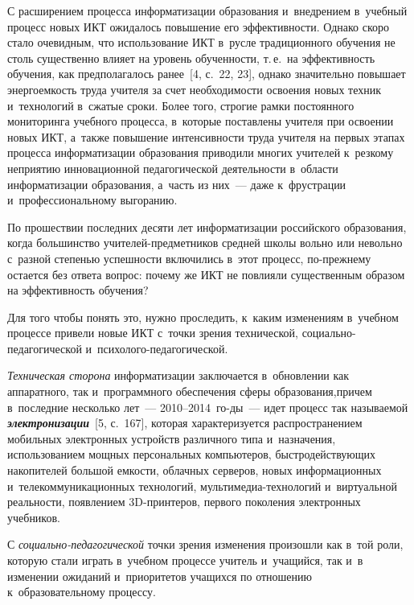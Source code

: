 \begin{multicols}{2}
  С расширением процесса информатизации образования и~внедрением в~учебный процесс
новых ИКТ ожидалось повышение его эффектив\-ности. Однако скоро стало очевидным, что
использование ИКТ в~русле традиционного обучения не столь существенно влияет на уровень
обучен\-ности, т.\,е.\ на эффективность обучения, как предполагалось ранее~[4, с.~22, 23], однако
значительно повышает энергоемкость труда учителя за счет необходимости освоения новых
техник и~технологий в~сжатые сроки. Более того, строгие рамки постоянного мониторинга
учебного процесса, в~которые поставлены учителя при освоении новых ИКТ, а~также
повышение интенсивности труда учителя на первых этапах процесса информатизации
образования приводили многих учителей к~резкому неприятию инновационной педагогической
деятельности в~области информатизации образования, а~часть из них~--- даже к~фрустрации
и~профессиональному выгоранию.

  По прошествии последних десяти лет информатизации российского образования, когда
большинство учи\-те\-лей-пред\-мет\-ни\-ков средней школы вольно или невольно с~разной
степенью успешности включились в~этот процесс, по-преж\-не\-му остается без ответа вопрос:
почему же ИКТ не повлияли существенным образом на эффективность обучения?

  Для того чтобы понять это, нужно проследить, к~каким изменениям в~учебном процессе
привели новые ИКТ с~точки зрения технической, со\-ци\-аль\-но-пе\-да\-го\-ги\-че\-ской
  и~пси\-хо\-ло\-го-пе\-да\-го\-ги\-ческой.

  \textit{Техническая сторона} информатизации заклю\-чается в~обновлении как аппаратного,
так и~программного обеспечения сферы образования,\linebreak причем в~последние несколько лет~---
2010--2014~го-\linebreak ды~--- идет процесс так называемой
{\bfseries\textit{электро\-ни\-зации}}~[5,
с.~167], которая характеризуется распространением мобильных электронных устройств\linebreak
различного типа и~назначения, использованием мощных персональных компьютеров,
быст\-ро\-действующих накопителей большой емкости, \mbox{облачных} серверов, новых
информационных и~телекоммуникационных технологий, муль\-ти\-ме\-диа-тех\-но\-ло\-гий
и~виртуальной реальности, появлением 3D-прин\-те\-ров, первого поколения электронных
учебников.

  С \textit{социально-педагогической} точки зрения изменения произошли как в~той роли,
которую стали играть в~учебном процессе учитель и~учащийся, так и~в изменении ожиданий
и~приоритетов учащихся по отношению к~образовательному процессу.


\end{multicols}
